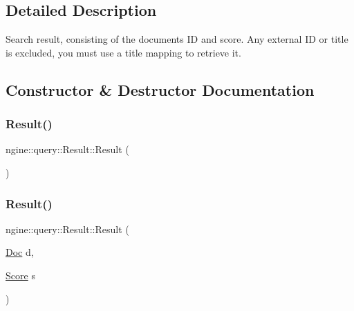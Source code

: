 \subsection{Detailed Description}
Search result, consisting of the document\textquotesingle{}s ID and score. Any external ID or title is excluded, you must use a title mapping to retrieve it. 

\subsection{Constructor \& Destructor Documentation}
\mbox{\label{structngine_1_1query_1_1Result_a4c8dd32e3e13ffc27de46483c077d99c}} 
\subsubsection{\texorpdfstring{Result()}{Result()}\hspace{0.1cm}{\footnotesize\ttfamily [1/2]}}
{\footnotesize\ttfamily ngine\+::query\+::\+Result\+::\+Result (\begin{DoxyParamCaption}{ }\end{DoxyParamCaption})\hspace{0.3cm}{\ttfamily [inline]}}

\mbox{\label{structngine_1_1query_1_1Result_aca94fc1de597366c47d3ab5930c029f3}} 
\subsubsection{\texorpdfstring{Result()}{Result()}\hspace{0.1cm}{\footnotesize\ttfamily [2/2]}}
{\footnotesize\ttfamily ngine\+::query\+::\+Result\+::\+Result (\begin{DoxyParamCaption}\item[{\hyperlink{structngine_1_1Doc}{Doc}}]{d,  }\item[{\hyperlink{structngine_1_1Score}{Score}}]{s }\end{DoxyParamCaption})\hspace{0.3cm}{\ttfamily [inline]}}



